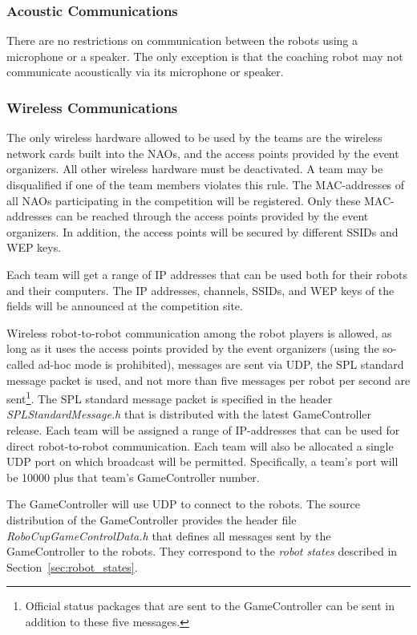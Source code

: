\documentclass[12pt]{article}
\begin{document}
\subsubsection{Acoustic Communications}

There are no restrictions on communication between the robots using a microphone or a speaker.  The only exception is that the coaching robot may not communicate acoustically via its microphone or speaker.

\subsubsection{Wireless Communications}
\label{sec:wireless}
The only wireless hardware allowed to be used by the teams are the wireless network cards built into the NAOs, and the access points provided by the event organizers. All other wireless hardware must be deactivated. A team may be disqualified if one of the team members violates this rule. The MAC-addresses of all NAOs participating in the competition will be registered. Only these MAC-addresses can be reached through the access points provided by the event organizers. In addition, the access points will be secured by different SSIDs and WEP keys. 

Each team will get a range of IP addresses that can be used both for their robots and their computers. The IP addresses, channels, SSIDs, and WEP keys of the fields will be announced at the competition site.

Wireless robot-to-robot communication among the robot players is allowed, as long as it uses the access points provided by the event organizers (using the so-called ad-hoc mode is prohibited), messages are sent via UDP, the SPL standard message packet is used, and not more than five messages per robot per second are sent\footnote{Official status packages that are sent to the GameController can be sent in addition to these five messages.}. The SPL standard message packet is specified in the header \emph{SPLStandardMessage.h} that is distributed with the latest GameController release. Each team will be assigned a range of IP-addresses that can be used for direct robot-to-robot communication. Each team will also be allocated a single UDP port on which broadcast will be permitted.  Specifically, a team's port will be 10000 plus that team's GameController number.

The GameController will use UDP to connect to the robots. The source distribution of the GameController provides the header file \emph{RoboCupGameControlData.h} that defines all messages sent by the GameController to the robots. They correspond to the \emph{robot states} described in Section~\ref{sec:robot_states}.
\end{document}
